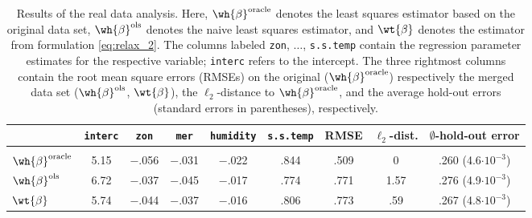 \documentclass[11pt]{article}
\begin{document}
\begin{table}
\begin{center}
\begin{tabular}{|l|c|c|c|c|c|c|c|c|}
\hline
                           &  {\footnotesize \texttt{interc}}  & {\footnotesize \texttt{zon}}  & {\footnotesize \texttt{mer}}   & {\footnotesize \texttt{humidity}}   & {\footnotesize \texttt{s.s.temp}}  & 
 {\small RMSE} & {\small $\ell_2$-dist.} & {\small $\emptyset$-hold-out error} \\[.35ex]
\hline
 &          &          &                      &                     &                    &                     & & 
\\[-1.5ex]
{\small $\wh{\beta}^{\text{oracle}}$} & {\small 5.15}  & {\small $-$.056}   &  {\small$-$.031} &  {\small$-$.022} &  {\small .844}   & {\small .509}  & 0& {\small .260 (4.6$\cdot10^{-3}$)}
\\[.7ex]
{\small $\wh{\beta}^{\text{ols}}$}    & {\small 6.72} & {\small $-$.037} &     {\small$-$.045}   &   {\small$-$.017}   &     {\small .774}  &  {\small .771}                    &  {\small 1.57} & {\small .276 (4.9$\cdot10^{-3}$)} \\[.7ex]

{\small $\wt{\beta}$}              &  {\small  5.74} & {\small $-$.044}   &   {\small$-$.037}   &       {\small $-$.016}     &    {\small .806}   & {\small .773}  &    {\small .59} & {\small.267 (4.8$\cdot10^{-3}$)}  \\    
\hline               
\end{tabular}
\end{center}
\vspace*{-0.2in}
\caption{Results of the real data analysis. Here, $\wh{\beta}^{\text{oracle}}$ denotes the least squares estimator based on the original data set, $\wh{\beta}^{\text{ols}}$ denotes the naive least squares estimator, and $\wt{\beta}$ denotes the estimator from formulation 
\eqref{eq:relax_2}. The columns labeled \texttt{zon}, $\ldots$, \texttt{s.s.temp} contain the regression parameter estimates for the respective variable; \texttt{interc} refers to the intercept. The three rightmost columns contain the root mean square errors (RMSEs) on the original ($\wh{\beta}^{\text{oracle}}$) respectively the merged data set ($\wh{\beta}^{\text{ols}}$,  $\wt{\beta}$),  the $\ell_2$-distance to $\wh{\beta}^{\text{oracle}}$, and the average hold-out errors (standard errors in parentheses), respectively.}\label{tab:relax}
\end{table}
\end{document}
